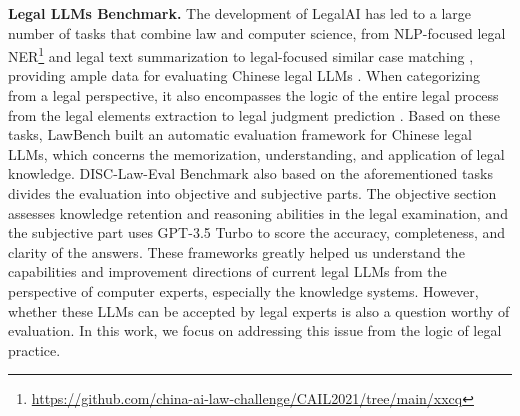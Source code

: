\textbf{Legal LLMs Benchmark.} 
The development of LegalAI has led to a large number of tasks that combine law and computer science, from NLP-focused legal NER\footnote{\url{https://github.com/china-ai-law-challenge/CAIL2021/tree/main/xxcq}} and legal text summarization \cite{kanapala2019text} to legal-focused similar case matching \cite{locke2022case, sansone2022legal}, providing ample data for evaluating Chinese legal LLMs \cite{zhong2020does}. 
When categorizing from a legal perspective, it also encompasses the logic of the entire legal process from the legal elements extraction \cite{cao2022cailie, zhang2022recognition, zhong2020iteratively} to legal judgment prediction \cite{feng2022legal, cui2023survey}. 
Based on these tasks, LawBench \cite{fei2023lawbench} built an automatic evaluation framework for Chinese legal LLMs, which concerns the memorization, understanding, and application of legal knowledge.
DISC-Law-Eval Benchmark \cite{yue2023disclawllm} also based on the aforementioned tasks divides the evaluation into objective and subjective parts. The objective section assesses knowledge retention and reasoning abilities in the legal examination, and the subjective part uses GPT-3.5 Turbo to score the accuracy, completeness, and clarity of the answers. These frameworks greatly helped us understand the capabilities and improvement directions of current legal LLMs from the perspective of computer experts, especially the knowledge systems. However, whether these LLMs can be accepted by legal experts is also a question worthy of evaluation. In this work, we focus on addressing this issue from the logic of legal practice.


